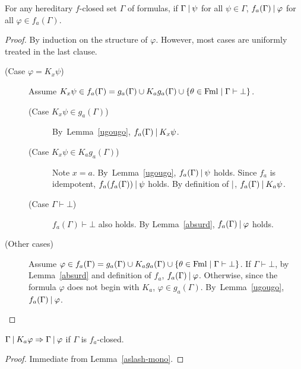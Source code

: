 \begin{lemma}
 For any hereditary $f$-closed set $\Gamma$ of formulas,
 if $\Gamma\mathbin{\mid} \psi$ for all $\psi\in\Gamma$,
 $f_a(\Gamma)\mathbin{\mid} \varphi$ for all $\varphi \in f_a(\Gamma)$.
\end{lemma}
\begin{proof}
  By induction on the structure of $\varphi$. However, most cases are uniformly treated in
 the last clause.
 \begin{description}
  \item[ (Case $\varphi = K_x\psi$)]
	     Assume $K_x\psi\in f_a(\Gamma) = g_a(\Gamma)\cup K_ag_a(\Gamma)\cup
	     \{\theta\in\operatorname{Fml}\mid\Gamma\vdash\bot\}$.
	     \begin{description}
	      \item[ (Case $K_x\psi\in g_a(\Gamma)$)]
			 By~Lemma~\ref{ugougo}, $f_a(\Gamma)\mathbin{\mid} K_x\psi$.
	      \item[ (Case $K_x\psi\in K_ag_a(\Gamma)$)]
			 Note $x = a$.
			 By~Lemma~\ref{ugougo},
			 $f_a(\Gamma)\mathbin{\mid}\psi$ holds.
			 Since $f_a$ is idempotent,
			 $f_a(f_a(\Gamma))\mathbin{\mid}\psi$ holds.
			 By definition of $\mathbin{\mid}$,
			 $f_a(\Gamma)\mathbin{\mid} K_a\psi$.
	      \item[ (Case $\Gamma\vdash\bot$)]
			 $f_a(\Gamma)\vdash\bot$ also holds.
			 By Lemma~\ref{absurd}, $f_a(\Gamma)\mathbin{\mid}\varphi$ holds.
	     \end{description}
  \item[ (Other cases)] 
	     Assume $\varphi\in f_a(\Gamma) = g_a(\Gamma)\cup K_ag_a(\Gamma)\cup
	     \{\theta\in\operatorname{Fml}\mid\Gamma\vdash\bot\}$.
	     If $\Gamma\vdash\bot$, by Lemma~\ref{absurd} and definition of $f_a$,
	     $f_a(\Gamma)\mathbin{\mid}\varphi$.
	     Otherwise, since the formula $\varphi$ does not begin with $K_a$,
	     $\varphi\in g_a(\Gamma)$.
	     By~Lemma~\ref{ugougo}, $f_a(\Gamma)\mathbin{\mid}\varphi$.
 \end{description}
\end{proof}


\begin{lemma}
 \label{T}
 $\Gamma\mathbin{\mid} K_a\varphi\Rightarrow \Gamma\mathbin{\mid}\varphi$ if $\Gamma$ is $f_a$-closed.
\end{lemma}
\begin{proof}
 Immediate from Lemma~\ref{aslash-mono}.
\end{proof}

